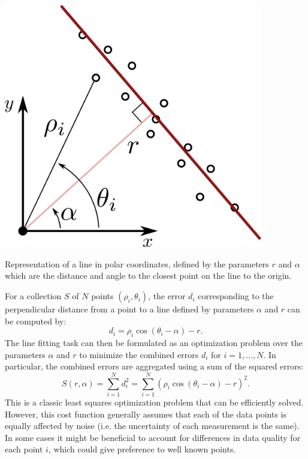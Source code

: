\begin{marginfigure}
  \centering
  \includegraphics[width=0.85\textwidth]{tex/figs/ch12_fig/polarlinefit.png}
  \caption{Representation of a line in polar coordinates, defined by the parameters $r$ and $\alpha$ which are the distance and angle to the closest point on the line to the origin.}
  \label{fig:polarline}
\end{marginfigure}
For a collection $S$ of $N$ points $(\rho_i, \theta_i)$, the error $d_i$ corresponding to the perpendicular distance from a point to a line defined by parameters $\alpha$ and $r$ can be computed by:
\begin{equation} \label{eq:lineerror}
d_i = \rho_i \cos(\theta_i - \alpha) - r.
\end{equation}
The line fitting task can then be formulated as an optimization problem over the parameters $\alpha$ and $r$ to minimize the combined errors $d_i$ for $i = 1,\dots,N$. In particular, the combined errors are aggregated using a sum of the squared errors:
\begin{equation}
    S(r,\alpha) = \sum_{i=1}^N d_i^2 = \sum_{i=1}^N(\rho_i \cos(\theta_i - \alpha) - r)^2.
    \label{eq:MSL}
\end{equation}
This is a classic least squares optimization problem that can be efficiently solved. However, this cost function generally assumes that each of the data points is equally affected by noise (i.e. the uncertainty of each measurement is the same). In some cases it might be beneficial to account for differences in data quality for each point $i$, which could give preference to well known points.

